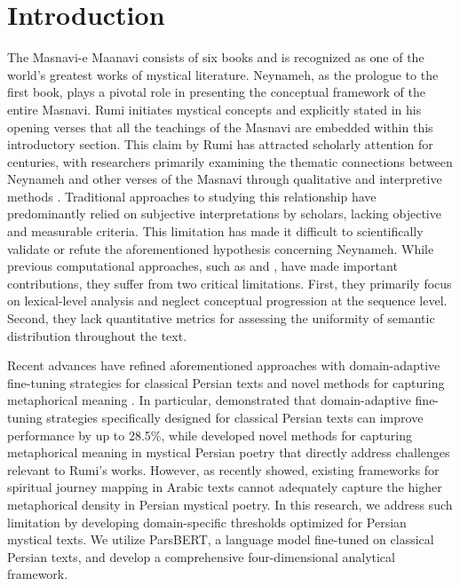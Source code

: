 \documentclass[twoside]{article}
\begin{document}
		\section{Introduction}
The Masnavi-e Maanavi   consists of six books and is recognized as one of the world's greatest works of mystical literature. Neynameh, as the prologue to the first book, plays a pivotal role in presenting the conceptual framework of the entire Masnavi. 
Rumi initiates mystical concepts and explicitly stated in his opening verses that all the teachings of the Masnavi are embedded within this introductory section.  This claim by Rumi has attracted scholarly attention for centuries, with researchers primarily examining the thematic connections between Neynameh and other verses of the Masnavi through qualitative and interpretive methods \citep{Jafari:2005}.   Traditional approaches to studying this relationship have predominantly relied on subjective interpretations by scholars, lacking objective and measurable criteria. This limitation has made it difficult to scientifically validate or refute the aforementioned hypothesis concerning Neynameh.  While previous computational approaches, such as  \cite{Shamsfard:2011} and \cite{MosaviJafari:2021}, have made important contributions, they suffer from two critical limitations.  First, they primarily focus on lexical-level analysis and neglect conceptual progression at the sequence level.  Second, they lack quantitative metrics for assessing the uniformity of semantic distribution throughout the text.  


Recent advances have refined   aforementioned approaches with domain-adaptive fine-tuning strategies for classical Persian texts \citep{AhmadiRezaei:2023} and novel methods for capturing metaphorical meaning \citep{Zamanietal:2023}. In particular, 
\cite{AhmadiRezaei:2023} demonstrated that domain-adaptive fine-tuning strategies specifically designed for classical Persian texts can improve performance by up to 28.5\%, while \cite{Zamanietal:2023} developed novel methods for capturing metaphorical meaning in mystical Persian poetry that directly address challenges relevant to Rumi's works. However, as \cite{RahimiHashemi:2023} recently showed, existing frameworks for spiritual journey mapping in Arabic texts cannot adequately capture the higher metaphorical density in Persian mystical poetry. In this research, we address such limitation by developing domain-specific thresholds optimized for Persian mystical texts. 
We utilize ParsBERT, a language model fine-tuned on classical Persian texts, and develop a comprehensive four-dimensional analytical framework.
\end{document}
